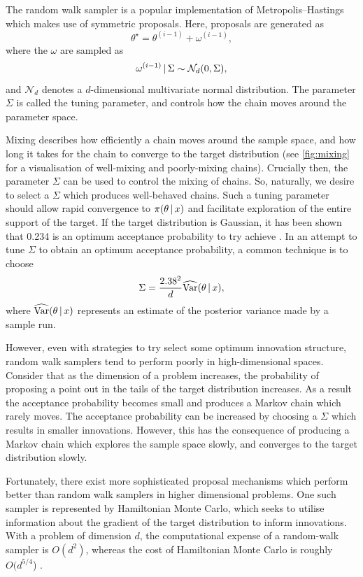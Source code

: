 The random walk sampler is a popular implementation of Metropolis--Hastings
which makes use of symmetric proposals. Here, proposals are generated as
\begin{equation*}
  \theta^\star = \theta^{(i-1)} + \omega^{(i-1)},
\end{equation*}
where the $\omega$ are sampled as
\begin{equation*}
   \omega^{(i-1)} \,|\, \Sigma \sim \mathcal{N}_d(0, \Sigma),
\end{equation*}
and $\mathcal{N}_d$ denotes a $d$-dimensional multivariate normal distribution.
The parameter $\Sigma$ is called the tuning parameter, and controls how the
chain moves around the parameter space.

Mixing describes how efficiently a chain moves around the sample space, and how
long it takes for the chain to converge to the target distribution (see
\cref{fig:mixing} for a visualisation of well-mixing and poorly-mixing chains).
Crucially then, the parameter $\Sigma$ can be used to control the mixing of
chains. So, naturally, we desire to select a $\Sigma$ which produces
well-behaved chains. Such a tuning parameter should allow rapid convergence to
$\pi(\theta \,|\, x)$ and facilitate exploration of the entire support of the
target. If the target distribution is Gaussian, it has been shown that 0.234
is an optimum acceptance probability to try achieve \parencite{roberts01}. In
an attempt to tune $\Sigma$ to obtain an optimum acceptance probability, a
common technique is to choose 
\begin{equation*}
  \Sigma = \frac{2.38^2}{d} \widehat{\text{Var}}(\theta \,|\, x),
\end{equation*}
where $\widehat{\text{Var}}(\theta \,|\, x)$ represents an estimate of the
posterior variance made by a sample run.

However, even with strategies to try select some optimum innovation structure,
random walk samplers tend to perform poorly in high-dimensional spaces.
Consider that as the dimension of a problem increases, the probability of
proposing a point out in the tails of the target distribution increases. As a
result the acceptance probability becomes small and produces a Markov chain
which rarely moves. The acceptance probability can be increased by choosing a
$\Sigma$ which results in smaller innovations. However, this has the
consequence of producing a Markov chain which explores the sample space slowly,
and converges to the target distribution slowly.

Fortunately, there exist more sophisticated proposal mechanisms which perform
better than random walk samplers in higher dimensional problems. One such
sampler is represented by Hamiltonian Monte Carlo, which seeks to utilise
information about the gradient of the target distribution to inform
innovations. With a problem of dimension $d$, the computational expense of a
random-walk sampler is $O(d^2)$, whereas the cost of Hamiltonian Monte Carlo is
roughly $O(d^{5/4}$) \parencite{creutz88}. 

